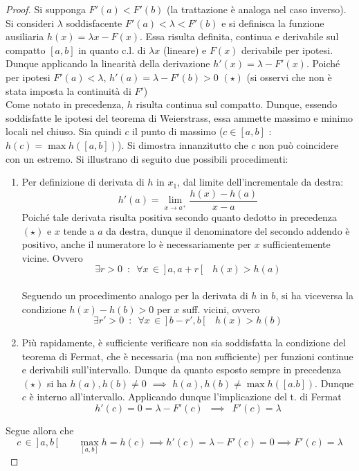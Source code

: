 \documentclass[10pt, oneside]{book}
\theoremstyle{plain}
\begin{document}
\begin{proof}
    Si supponga $F'(a) < F'(b)$ (la trattazione è analoga nel caso inverso). Si consideri $\lambda$ soddisfacente $F'(a) < \lambda < F'(b)$ e si definisca la funzione ausiliaria $h(x) = \lambda x - F(x)$. Essa risulta definita, continua e derivabile sul compatto $[a,b]$ in quanto c.l. di $\lambda x$ (lineare) e $F(x)$ derivabile per ipotesi. Dunque applicando la linearità della derivazione $h'(x) = \lambda - F'(x)$. Poiché per ipotesi $F'(a) < \lambda$, $h'(a) = \lambda - F'(b) > 0$ $(\star)$ (si osservi che non è stata imposta la continuità di $F'$)
    \\Come notato in precedenza, $h$ risulta continua sul compatto. Dunque, essendo soddisfatte le ipotesi del teorema di Weierstrass, essa ammette massimo e minimo locali nel chiuso. Sia quindi $c$ il punto di massimo ($c \in [a,b]$ : $h(c) = \max h([a,b])$). Si dimostra innanzitutto che $c$ non può coincidere con un estremo. Si illustrano di seguito due possibili procedimenti:
    \begin{enumerate}
        \item Per definizione di derivata di $h$ in $x_1$, dal limite dell'incrementale da destra:
        \[h'(a) = \lim \limits_{x \rightarrow a^+} \frac{h(x) - h(a)}{x - a}\]
        Poiché tale derivata risulta positiva secondo quanto dedotto in precedenza $(\star)$ e $x$ tende a $a$ da destra, dunque il denominatore del secondo addendo è positivo, anche il numeratore lo è necessariamente per $x$ sufficientemente vicine. Ovvero 
        \[\exists r > 0 \enspace  : \enspace \forall x \, \in \, \big] \, a, a + r \, \big[ \quad  h(x) > h(a)\]
        \\Seguendo un procedimento analogo per la derivata di $h$ in $b$, si ha viceversa la condizione $h(x) - h(b) > 0$ per $x$ suff. vicini, ovvero
        \[\exists r'>0 \enspace : \enspace \forall x \, \in \, \big] \, b - r', b \, \big[ \quad h(x) > h(b)\]
        \item Più rapidamente, è sufficiente verificare non sia soddisfatta la condizione del teorema di Fermat, che è necessaria (ma non sufficiente) per funzioni continue e derivabili sull'intervallo. Dunque da quanto esposto sempre in precedenza $(\star)$ si ha $h(a), h(b) \neq 0$ $\implies$ $h(a) , h(b) \neq \max h([a.b])$. Dunque $c$ è interno all'intervallo. Applicando dunque l'implicazione del t. di Fermat 
        \[h'(c) = 0 = \lambda - F'(c) \enspace \implies \enspace F'(c) = \lambda\]
    \end{enumerate}
Segue allora che
\[c \, \in \, \big] \, a, b \, \big[ \qquad \max\limits_{[a,b]} h = h(c) \implies h'(c) = \lambda - F'(c) = 0 \implies F'(c) = \lambda\]
\end{proof}
\end{document}
